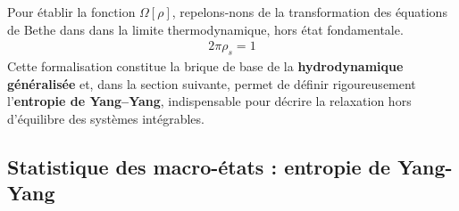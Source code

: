 
\medskip
Pour établir la fonction $\Omega[\rho]$, repelons-nons de la transformation des équations de Bethe dans dans la limite thermodynamique, hors état fondamentale.
\begin{eqnarray*}
	2\pi \rho_s = 1
\end{eqnarray*}
\medskip
Cette formalisation constitue la brique de base de la \textbf{hydrodynamique généralisée} et, dans la section suivante, permet de définir rigoureusement l’\textbf{entropie de Yang–Yang}, indispensable pour décrire la relaxation hors d’équilibre des systèmes intégrables.


%



\subsection{Statistique des macro-états : entropie de Yang-Yang}



